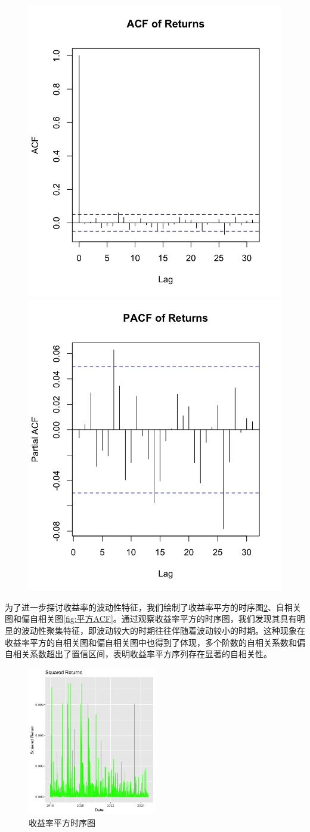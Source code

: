 \documentclass[12pt]{article}
\begin{document}
\begin{figure}[H]
\centering
{}
{\includegraphics[width=.4\textwidth]{G3.png}}
{\includegraphics[width=.4\textwidth]{G4.png}}
\caption{}\label{fig:ACF}
\end{figure}

为了进一步探讨收益率的波动性特征，我们绘制了收益率平方的时序图\ref{fig:平方}、自相关图和偏自相关图\ref{fig:平方ACF}。通过观察收益率平方的时序图，我们发现其具有明显的波动性聚集特征，即波动较大的时期往往伴随着波动较小的时期。这种现象在收益率平方的自相关图和偏自相关图中也得到了体现，多个阶数的自相关系数和偏自相关系数超出了置信区间，表明收益率平方序列存在显著的自相关性。

\begin{figure}[H]
\centering
\includegraphics[width=0.5\textwidth]{G5.png}
\caption{收益率平方时序图}
\label{fig:平方}
\end{figure}
\end{document}
